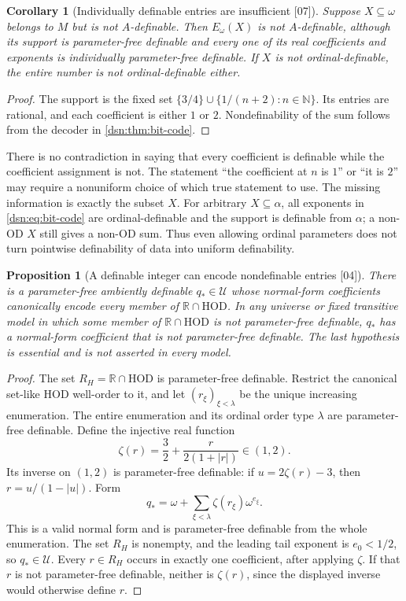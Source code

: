 \documentclass[11pt,a4paper]{article}
\numberwithin{equation}{section}
\newtheorem{proposition}[proposition]{Proposition}
\newtheorem{corollary}[corollary]{Corollary}
\theoremstyle{definition}
\theoremstyle{remark}
\newcommand{\OD}{\mathrm{OD}}
\newcommand{\HOD}{\mathrm{HOD}}
\newcommand{\N}{\mathbb N}
\newcommand{\R}{\mathbb R}
\newcommand{\Cell}{\mathcal U}
\newcommand{\src}[1]{\textup{\textsf{\small[#1]}}}
\begin{document}
\begin{corollary}[Individually definable entries are insufficient \src{07}]\label{dsn:cor:entries-insufficient}
Suppose $X\subseteq\omega$ belongs to $M$ but is not $A$-definable. Then
$E_\omega(X)$ is not $A$-definable, although its support is parameter-free
definable and every one of its real coefficients and exponents is
individually parameter-free definable. If $X$ is not ordinal-definable,
the entire number is not ordinal-definable either.
\end{corollary}
\begin{proof}
The support is the fixed set $\{3/4\}\cup\{1/(n+2):n\in\N\}$. Its entries
are rational, and each coefficient is either $1$ or $2$. Nondefinability of
the sum follows from the decoder in \cref{dsn:thm:bit-code}.
\end{proof}

There is no contradiction in saying that every coefficient is definable
while the coefficient assignment is not. The statement ``the coefficient
at $n$ is $1$'' or ``it is $2$'' may require a nonuniform choice of which
true statement to use. The missing information is exactly the subset $X$.
For arbitrary $X\subseteq\alpha$, all exponents in \eqref{dsn:eq:bit-code}
are ordinal-definable and the support is definable from $\alpha$; a
non-$\OD$ $X$ still gives a non-$\OD$ sum. Thus even allowing ordinal
parameters does not turn pointwise definability of data into uniform
definability.

\begin{proposition}[A definable integer can encode nondefinable entries \src{04}]
\label{dsn:prop:collector}
There is a parameter-free ambiently definable $q_*\in\Cell$ whose
normal-form coefficients canonically encode every member of
$\R\cap\HOD$. In any universe or fixed transitive model in which
some member of $\R\cap\HOD$ is not parameter-free definable, $q_*$
has a normal-form coefficient that is not parameter-free definable.
The last hypothesis is essential and is not asserted in every model.
\end{proposition}
\begin{proof}
The set $R_H=\R\cap\HOD$ is parameter-free definable. Restrict the
canonical set-like $\HOD$ well-order to it, and let
$(r_\xi)_{\xi<\lambda}$ be the unique increasing enumeration. The
entire enumeration and its ordinal order type $\lambda$ are
parameter-free definable. Define the injective real function
\[
 \zeta(r)=\frac32+\frac{r}{2(1+|r|)}\in(1,2).
\]
Its inverse on $(1,2)$ is parameter-free definable: if
$u=2\zeta(r)-3$, then $r=u/(1-|u|)$. Form
\begin{equation}\label{dsn:eq:collector}
 q_*=\omega+\sum_{\xi<\lambda}\zeta(r_\xi)\omega^{e_\xi}.
\end{equation}
This is a valid normal form and is parameter-free definable from the
whole enumeration. The set $R_H$ is nonempty, and the leading tail
exponent is $e_0<1/2$, so $q_*\in\Cell$. Every $r\in R_H$ occurs
in exactly one coefficient, after applying $\zeta$.
If that $r$ is not parameter-free definable, neither is $\zeta(r)$,
since the displayed inverse would otherwise define $r$.
\end{proof}
\end{document}
